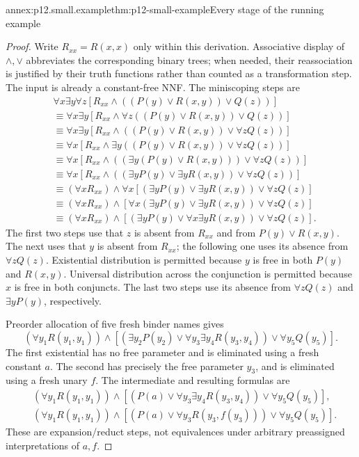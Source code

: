 \begin{annexitem}{annex:p12.small.example}{thm:p12-small-example}{Every stage of the running example}
\begin{proof}
Write \(R_{xx}=R(x,x)\) only within this derivation. Associative
display of \(\land,\lor\) abbreviates the corresponding binary
trees; when needed, their reassociation is justified by their
truth functions rather than counted as a transformation step.
The input is already a constant-free NNF. The miniscoping steps are
\[
\begin{aligned}
&\forall x\exists y\forall z
       [R_{xx}\land((P(y)\lor R(x,y))\lor Q(z))]\\
&\equiv\forall x\exists y
       [R_{xx}\land\forall z((P(y)\lor R(x,y))\lor Q(z))]\\
&\equiv\forall x\exists y
       [R_{xx}\land((P(y)\lor R(x,y))\lor\forall z Q(z))]\\
&\equiv\forall x
       [R_{xx}\land\exists y((P(y)\lor R(x,y))\lor\forall z Q(z))]\\
&\equiv\forall x
       [R_{xx}\land((\exists y(P(y)\lor R(x,y)))\lor\forall z Q(z))]\\
&\equiv\forall x
       [R_{xx}\land((\exists y P(y)\lor\exists y R(x,y))\lor\forall z Q(z))]\\
&\equiv(\forall x R_{xx})\land
       \forall x[(\exists y P(y)\lor\exists y R(x,y))\lor\forall z Q(z)]\\
&\equiv(\forall x R_{xx})\land
       [\forall x(\exists y P(y)\lor\exists y R(x,y))\lor\forall z Q(z)]\\
&\equiv(\forall x R_{xx})\land
       [(\exists y P(y)\lor\forall x\exists y R(x,y))\lor\forall z Q(z)].
\end{aligned}
\]
The first two steps use that \(z\) is absent from \(R_{xx}\)
and from \(P(y)\lor R(x,y)\). The next uses that \(y\) is
absent from \(R_{xx}\); the following one uses its absence from
\(\forall z Q(z)\). Existential distribution is permitted because
\(y\) is free in both \(P(y)\) and \(R(x,y)\). Universal
distribution across the conjunction is permitted because \(x\)
is free in both conjuncts. The last two steps use its absence
from \(\forall z Q(z)\) and \(\exists y P(y)\), respectively.

Preorder allocation of five fresh binder names gives
\[
 (\forall y_1 R(y_1,y_1))\land
 [(\exists y_2 P(y_2)\lor
          \forall y_3\exists y_4 R(y_3,y_4))\lor\forall y_5 Q(y_5)].
\]
The first existential has no free parameter and is eliminated
using a fresh constant \(a\). The second has precisely the free
parameter \(y_3\), and is eliminated using a fresh unary \(f\).
The intermediate and resulting formulas are
\[
\begin{aligned}
 &(\forall y_1 R(y_1,y_1))\land
 [(P(a)\lor\forall y_3\exists y_4 R(y_3,y_4))\lor\forall y_5 Q(y_5)],\\
 &(\forall y_1 R(y_1,y_1))\land
 [(P(a)\lor\forall y_3 R(y_3,f(y_3)))\lor\forall y_5 Q(y_5)].
\end{aligned}
\]
These are expansion/reduct steps, not equivalences under arbitrary
preassigned interpretations of \(a,f\).


\end{proof}
\end{annexitem}
